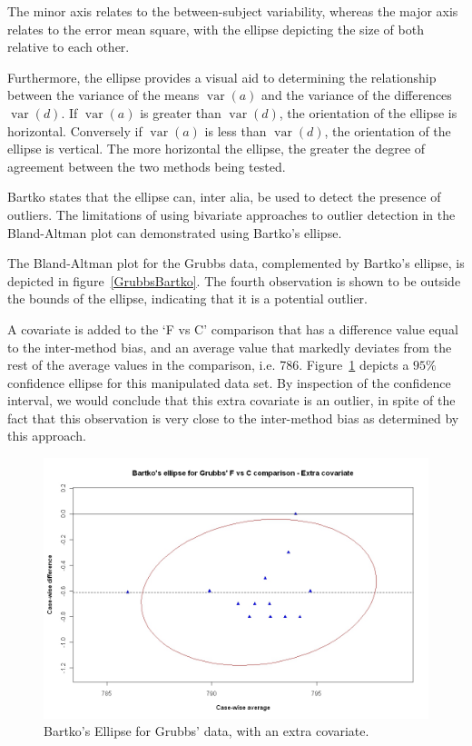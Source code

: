 \documentclass[12pt, a4paper]{report}
\theoremstyle{plain}
\theoremstyle{definition}
\theoremstyle{remark}
\begin{document}
The minor axis relates to the between-subject variability, whereas the major axis relates to the error mean square, with the ellipse depicting the size of both relative to each other.

Furthermore, the ellipse provides a visual aid to determining the relationship between the variance of the means $\operatorname{var}(a)$ and the variance of the differences $\operatorname{var}(d)$. If $\operatorname{var}(a)$ is greater than $\operatorname{var}(d)$, the orientation of the ellipse is horizontal. Conversely if $\operatorname{var}(a)$ is less than $\operatorname{var}(d)$, the orientation of the ellipse is vertical. The more horizontal the ellipse, the greater the degree of agreement between the two methods being tested.


Bartko states that the ellipse can, inter alia, be used to detect the presence of outliers. The limitations of using bivariate approaches to outlier detection in the Bland-Altman plot can demonstrated using Bartko's ellipse.


The Bland-Altman plot for the Grubbs data, complemented by Bartko's ellipse, is depicted in figure~\ref{GrubbsBartko}.
The fourth observation is shown to be outside the bounds of the ellipse, indicating that it is a potential outlier.

A covariate is added to the `F vs C' comparison that has a difference value equal to the inter-method bias, and an average value that markedly deviates from the rest of the average values
in the comparison, i.e. 786. Figure~\ref{GrubbsBartko2} depicts a $95\%$ confidence
ellipse for this manipulated data set. By inspection of the confidence interval, we would conclude that this extra covariate is an outlier, in spite of the fact that this observation is very close to the inter-method bias as determined by this approach.

\begin{figure}[h!]
	\includegraphics[width=130mm]{images/GrubbsBartko2.jpeg}
	\caption{Bartko's Ellipse for Grubbs' data, with an extra covariate.}\label{GrubbsBartko2}
\end{figure}
\end{document}
